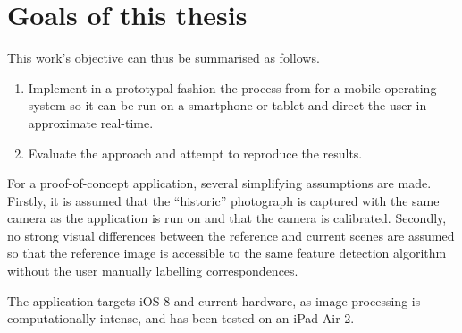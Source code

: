 \section{Goals of this thesis}

This work's objective can thus be summarised as follows.
\begin{enumerate}
   \item Implement in a prototypal fashion the process from \citep{bae2010} for
      a mobile operating system so it can be run on a smartphone or tablet and
      direct the user in approximate real-time.
   \item Evaluate the approach and attempt to reproduce the results.
\end{enumerate}

For a proof-of-concept application, several simplifying assumptions are made.
Firstly, it is assumed that the ``historic'' photograph is captured with the
same camera as the application is run on and that the camera is calibrated.
Secondly, no strong visual differences between the reference and current scenes
are assumed so that the reference image is accessible to the same feature
detection algorithm without the user manually labelling correspondences. 

The application targets iOS 8 and current hardware, as image processing is
computationally intense, and has been tested on an iPad Air 2.
